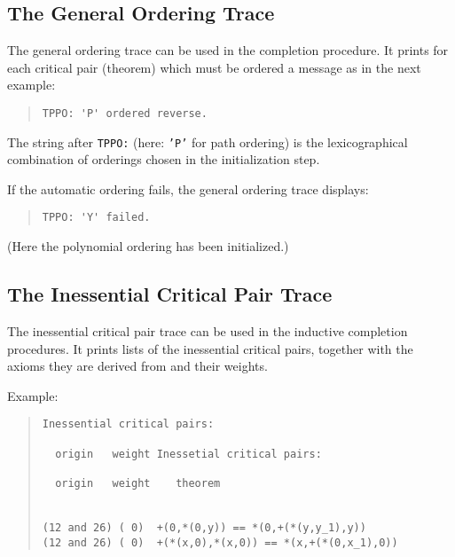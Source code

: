 \subsection{The General Ordering Trace}
The general ordering trace can be used in the completion procedure.
It prints for each critical pair (theorem) which
must be ordered a message as in the next example:
\begin{quote}
\begin{verbatim}
TPPO: 'P' ordered reverse.
\end{verbatim}
\end{quote}
The string after {\tt TPPO:} (here: {\tt 'P'} for path ordering) is the 
lexicographical combination of orderings chosen in the initialization step.

If the automatic ordering fails, the general ordering trace displays:
\begin{quote}
\begin{verbatim}
TPPO: 'Y' failed.
\end{verbatim}
\end{quote}
(Here the polynomial ordering has been initialized.)

\subsection{The Inessential Critical Pair Trace}
The inessential critical pair trace can be used in the inductive completion
procedures.
It prints lists of the inessential critical pairs, together with
the axioms they are derived from and their weights.

\noindent
Example:
\begin{quote}
\begin{verbatim}
Inessential critical pairs:

  origin   weight Inessetial critical pairs: 
 
  origin   weight    theorem
 
 
(12 and 26) ( 0)  +(0,*(0,y)) == *(0,+(*(y,y_1),y))
(12 and 26) ( 0)  +(*(x,0),*(x,0)) == *(x,+(*(0,x_1),0))
\end{verbatim}
\end{quote}

